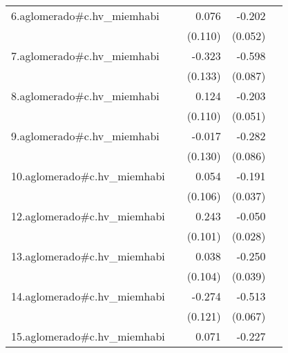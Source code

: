 {\begin{longtable}{l*{4}{D{.}{.}{-1}}}
\addlinespace
6.aglomerado#c.hv\_miemhabi&                     &       0.076         &      -0.202\sym{***}&                     \\
            &                     &     (0.110)         &     (0.052)         &                     \\
\addlinespace
7.aglomerado#c.hv\_miemhabi&                     &      -0.323\sym{*}  &      -0.598\sym{***}&                     \\
            &                     &     (0.133)         &     (0.087)         &                     \\
\addlinespace
8.aglomerado#c.hv\_miemhabi&                     &       0.124         &      -0.203\sym{***}&                     \\
            &                     &     (0.110)         &     (0.051)         &                     \\
\addlinespace
9.aglomerado#c.hv\_miemhabi&                     &      -0.017         &      -0.282\sym{**} &                     \\
            &                     &     (0.130)         &     (0.086)         &                     \\
\addlinespace
10.aglomerado#c.hv\_miemhabi&                     &       0.054         &      -0.191\sym{***}&                     \\
            &                     &     (0.106)         &     (0.037)         &                     \\
\addlinespace
12.aglomerado#c.hv\_miemhabi&                     &       0.243\sym{*}  &      -0.050         &                     \\
            &                     &     (0.101)         &     (0.028)         &                     \\
\addlinespace
13.aglomerado#c.hv\_miemhabi&                     &       0.038         &      -0.250\sym{***}&                     \\
            &                     &     (0.104)         &     (0.039)         &                     \\
\addlinespace
14.aglomerado#c.hv\_miemhabi&                     &      -0.274\sym{*}  &      -0.513\sym{***}&                     \\
            &                     &     (0.121)         &     (0.067)         &                     \\
\addlinespace
15.aglomerado#c.hv\_miemhabi&                     &       0.071         &      -0.227\sym{***}&                     \\

\end{longtable}}
